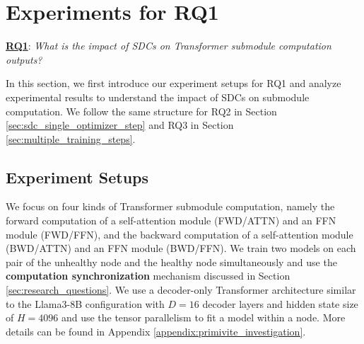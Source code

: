 \section{Experiments for RQ1}
\label{sec:primitive}
\underline{\textbf{RQ1}}: \emph{What is the impact of SDCs on Transformer submodule computation outputs?}

In this section, we first introduce our experiment setups for RQ1 and analyze experimental results to understand the impact of SDCs on submodule computation. We follow the same structure for RQ2 in  Section \ref{sec:sdc_single_optimizer_step} and RQ3 in Section \ref{sec:multiple_training_steps}.

\subsection{Experiment Setups}
\label{methods:primitive_impact}
We focus on four kinds of Transformer submodule computation, namely the forward computation of a self-attention module (FWD/ATTN) and an FFN module (FWD/FFN), and the backward computation of a self-attention module (BWD/ATTN) and an FFN module (BWD/FFN). We train two models on each pair of the unhealthy node and the healthy node simultaneously and use the \textbf{computation synchronization} mechanism discussed in Section \ref{sec:research_questions}. We use a decoder-only Transformer architecture similar to the Llama3-8B configuration \cite{dubey2024llama3herdmodels} with $D=16$ decoder layers and hidden state size of $H=4096$ and use the tensor parallelism to fit a model within a node. More details can be found in Appendix \ref{appendix:primivite_investigation}.

